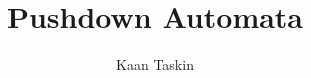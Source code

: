 \documentclass[11pt,a4paper]{article}
\begin{document}
\title{Pushdown Automata}
\author{Kaan Taskin}
\maketitle

\tableofcontents





\end{document}
